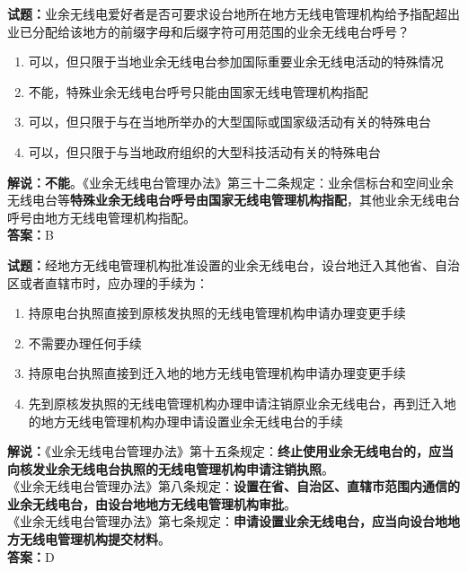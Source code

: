 \documentclass{ctexbook}
\begin{document}
\bigskip


\noindent\textbf{试题：}业余无线电爱好者是否可要求设台地所在地方无线电管理机构给予指配超出业已分配给该地方的前缀字母和后缀字符可用范围的业余无线电台呼号？
\begin{enumerate}[leftmargin=3em]
\item 可以，但只限于当地业余无线电台参加国际重要业余无线电活动的特殊情况
\item 不能，特殊业余无线电台呼号只能由国家无线电管理机构指配
\item 可以，但只限于与在当地所举办的大型国际或国家级活动有关的特殊电台
\item 可以，但只限于与当地政府组织的大型科技活动有关的特殊电台
\end{enumerate}
\textbf{解说：不能}。《业余无线电台管理办法》第三十二条规定：业余信标台和空间业余无线电台等\textbf{特殊业余无线电台呼号由国家无线电管理机构指配}，其他业余无线电台呼号由地方无线电管理机构指配。\\\noindent\textbf{答案：}B



\bigskip


\noindent\textbf{试题：}经地方无线电管理机构批准设置的业余无线电台，设台地迁入其他省、自治区或者直辖市时，应办理的手续为：
\begin{enumerate}[leftmargin=3em]
\item 持原电台执照直接到原核发执照的无线电管理机构申请办理变更手续
\item 不需要办理任何手续
\item 持原电台执照直接到迁入地的地方无线电管理机构申请办理变更手续
\item 先到原核发执照的无线电管理机构办理申请注销原业余无线电台，再到迁入地的地方无线电管理机构办理申请设置业余无线电台的手续
\end{enumerate}
\noindent\textbf{解说：}《业余无线电台管理办法》第十五条规定：\textbf{终止使用业余无线电台的，应当向核发业余无线电台执照的无线电管理机构申请注销执照}。\\
《业余无线电台管理办法》第八条规定：\textbf{设置在省、自治区、直辖市范围内通信的业余无线电台，由设台地地方无线电管理机构审批}。\\
《业余无线电台管理办法》第七条规定：\textbf{申请设置业余无线电台，应当向设台地地方无线电管理机构提交材料}。\\\noindent\textbf{答案：}D


\bigskip
\end{document}
